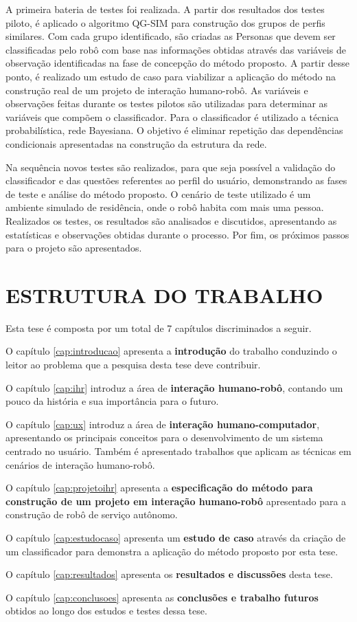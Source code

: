 A primeira bateria de testes foi realizada. A partir dos resultados dos testes piloto, é aplicado o algoritmo QG-SIM para construção dos grupos de perfis similares. Com cada grupo identificado, são criadas as Personas que devem ser classificadas pelo robô com base nas informações obtidas através das variáveis de observação identificadas na fase de concepção do método proposto. A partir desse ponto, é realizado um estudo de caso para viabilizar a aplicação do método na construção real de um projeto de interação humano-robô. As variáveis e observações feitas durante os testes pilotos são utilizadas para determinar as variáveis que compõem o classificador. Para o classificador é utilizado a técnica probabilística, rede Bayesiana. O objetivo é eliminar repetição das dependências condicionais apresentadas na construção da estrutura da rede.

Na sequência novos testes são realizados, para que seja possível a validação do classificador e das questões referentes ao perfil do usuário, demonstrando as fases de teste e análise do método proposto. O cenário de teste utilizado é um ambiente simulado de residência, onde o robô habita com mais uma pessoa. Realizados os testes, os resultados são analisados e discutidos, apresentando as estatísticas e observações obtidas durante o processo. Por fim, os próximos passos para o projeto são apresentados.

\section{ESTRUTURA DO TRABALHO} %
Esta tese é composta por um total de 7 capítulos discriminados a seguir.

O capítulo \ref{cap:introducao} apresenta a \textbf{introdução} do trabalho conduzindo o leitor ao problema que a pesquisa desta tese deve contribuir.

O capítulo \ref{cap:ihr} introduz a área de \textbf{interação humano-robô}, contando um pouco da história e sua importância para o futuro.

O capítulo \ref{cap:ux} introduz a área de \textbf{interação humano-computador}, apresentando os principais conceitos para o desenvolvimento de um sistema centrado no usuário. Também é apresentado trabalhos que aplicam as técnicas em cenários de interação humano-robô.

O capítulo \ref{cap:projetoihr} apresenta a \textbf{especificação do método para construção de um projeto em interação humano-robô} apresentado para a construção de robô de serviço autônomo.

O capítulo \ref{cap:estudocaso} apresenta um \textbf{estudo de caso}  através da criação de um classificador para demonstra a aplicação do método proposto por esta tese.

O capítulo \ref{cap:resultados} apresenta os \textbf{resultados e discussões} desta tese.

O capítulo \ref{cap:conclusoes} apresenta as \textbf{conclusões e trabalho futuros} obtidos ao longo dos estudos e testes dessa tese.
